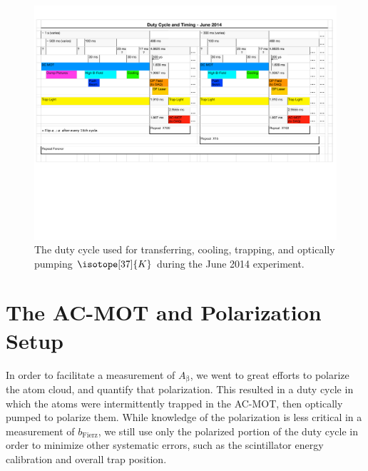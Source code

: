 \begin{figure}[h!!t]
	\centering
	\includegraphics[width=.999\linewidth]
	{Figures/DutyCycle_2014.pdf}
	\caption{The duty cycle used for transferring, cooling, trapping, and optically pumping $\isotope[37]{K}$ during the June 2014 experiment.}	
	\label{fig:dutycycle}
\end{figure}

\section{The AC-MOT and Polarization Setup}
\label{section:acmot_and_polarization}
In order to facilitate a measurement of $A_{\mathrm{\beta}}$, we went to great efforts to polarize the atom cloud, and quantify that polarization.  This resulted in a duty cycle in which the atoms were intermittently trapped in the AC-MOT, then optically pumped to polarize them.  While knowledge of the polarization is less critical in a measurement of $b_{\mathrm{Fierz}}$, we still use only the polarized portion of the duty cycle in order to minimize other systematic errors, such as the scintillator energy calibration and overall trap position.



